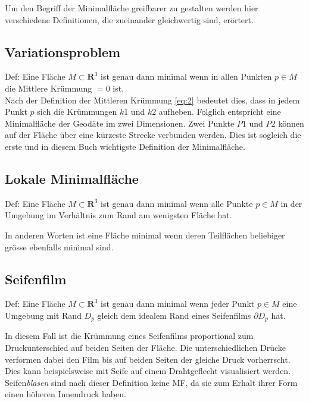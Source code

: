 Um den Begriff der Minimalfläche greifbarer zu gestalten werden hier verschiedene Definitionen, die zueinander gleichwertig sind, erörtert.

\subsection{Variationsproblem}

Def: Eine Fläche $ \textit{M} \subset \mathbf{R}^{3} $ ist genau dann minimal wenn in allen Punkten $p \in M$ die Mittlere Krümmung $=0$ ist.\\
Nach der Definition der Mittleren Krümmung \ref{eq:2} bedeutet dies, dass in jedem Punkt $p$ sich die Krümmungen $k1$ und $k2$ aufheben.
Folglich entspricht eine Minimalfläche der Geodäte im zwei Dimensionen. Zwei Punkte $P1$ und $P2$ können auf der Fläche über eine kürzeste Strecke verbunden werden.  Dies ist sogleich die erste und in diesem Buch wichtigste Definition der Minimalfläche.

\subsection{Lokale Minimalfläche}

Def: Eine Fläche $ \textit{M} \subset \mathbf{R}^{3} $ ist genau dann minimal wenn alle Punkte $ p \in M $ in der Umgebung  im Verhältnis zum Rand am wenigsten Fläche hat.

In anderen Worten ist eine Fläche minimal wenn deren Teilflächen beliebiger grösse ebenfalls minimal sind.  

\subsection{Seifenfilm}

Def: Eine Fläche $ \textit{M} \subset \mathbf{R}^{3} $ ist genau dann minimal wenn jeder Punkt $p \in M$ eine Umgebung mit Rand $D_p$ gleich dem idealem Rand eines Seifenfilms $\partial D_p$ hat.

In diesem Fall ist die Krümmung eines Seifenfilms proportional zum Druckunterschied auf beiden Seiten der Fläche. Die unterschiedlichen Drücke verformen dabei den Film bis auf beiden Seiten der gleiche Druck vorherrscht. Dies kann beispielsweise mit Seife auf einem Drahtgeflecht visualisiert werden. Seifen\textit{blasen} sind nach dieser Definition keine MF, da sie zum Erhalt ihrer Form einen höheren Innendruck haben.

